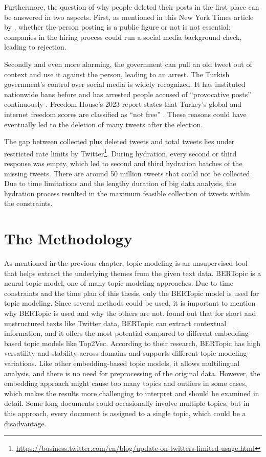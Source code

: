 Furthermore, the question of why people deleted their posts in the first place 
can be answered in two aspects. First, as mentioned in this New York Times article 
by \textcite{klosowski_delete_tweets_2022}, whether the person posting is a public figure 
or not is not essential\@: companies in the hiring process could run a social media 
background check, leading to rejection. 

Secondly and even more alarming, the government can pull 
an old tweet out of context and use it against the person, leading to an arrest. 
The Turkish government's control over social media is widely recognized. 
It has instituted nationwide bans before and has arrested people accused of 
``provocative posts'' continuously \parencite{scott_turkey_social_media_ban_2023}.
Freedom House's 2023 report states that Turkey's global and internet freedom scores are 
classified as ``not free'' \parencite{freedom-house_turkey_report}. 
These reasons could have eventually led to the deletion of many tweets 
after the election.

The gap between collected plus deleted tweets and total tweets lies under restricted 
rate limits by Twitter\footnote{\url{https://business.twitter.com/en/blog/update-on-twitters-limited-usage.html}}. 
During hydration, every second or third response was empty, which led to second 
and third hydration batches of the missing tweets. There are around 50 million tweets
that could not be collected. Due to time limitations 
and the lengthy duration of big data analysis, the hydration process resulted in the 
maximum feasible collection of tweets within the constraints.

\section{The Methodology}

As mentioned in the previous chapter, topic modeling is an unsupervised tool that helps 
extract the underlying themes from the given text data. BERTopic is a neural topic model, 
one of many topic modeling approaches.
Due to time constraints and the time plan of this thesis, only the BERTopic model 
is used for topic modeling. Since several methods could be used, it is important 
to mention why BERTopic is used and why the others are not.
\textcite{topic_model_comparison_bertopic_2022} found out that for short and 
unstructured texts like Twitter data, BERTopic can extract contextual information, 
and it offers the most potential compared to different embedding-based topic models like Top2Vec.
According to their research, BERTopic has high versatility and stability across 
domains and supports different topic modeling variations. Like other embedding-based 
topic models, it allows multilingual analysis, and there is no need for 
preprocessing of the original data. However, the embedding approach might cause 
too many topics and outliers in some cases, which makes the results more 
challenging to interpret and should be examined in detail. 
Some long documents could occasionally involve multiple topics, but in this 
approach, every document is assigned to a single topic, which could be a 
disadvantage.


